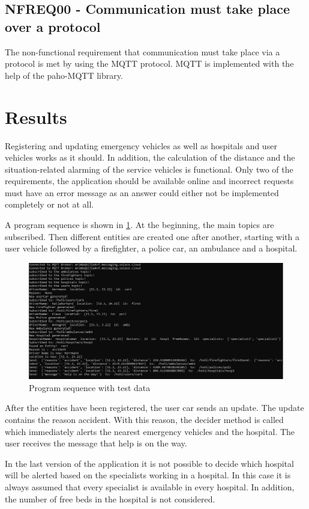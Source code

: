 \subsection{NFREQ00 - Communication must take place over a protocol}
The non-functional requirement that communication must take place via a protocol is met by using the MQTT protocol. MQTT is implemented with the help of the paho-MQTT library.

\section{Results}
\label{sec:5}
Registering and updating emergency vehicles as well as hospitals and user vehicles works as it should. In addition, the calculation of the distance and the situation-related alarming of the service vehicles is functional. Only two of the requirements, the application should be available online and incorrect requests must have an error message as an answer could either not be implemented completely or not at all.

A program sequence is shown in \ref{console}. At the beginning, the main topics are subscribed. Then different entities are created one after another, starting with a user vehicle followed by a firefighter, a police car, an ambulance and a hospital.

\begin{figure}
\sidecaption
\includegraphics[scale=0.5]{images/walter/console.PNG}
\caption{Program sequence with test data}
\label{console}
\end{figure}
After the entities have been registered, the user car sends an update. The update contains the reason accident. With this reason, the decider method is called which immediately alerts the nearest emergency vehicles and the hospital. The user receives the message that help is on the way.

In the last version of the application it is not possible to decide which hospital will be alerted based on the specialists working in a hospital. In this case it is always assumed that every specialist is available in every hospital. In addition, the number of free beds in the hospital is not considered.

